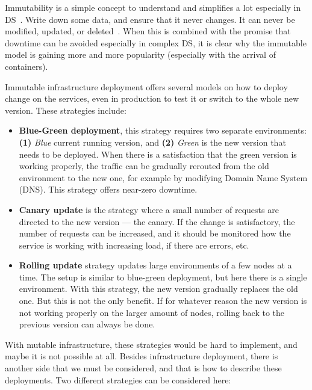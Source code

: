 Immutability is a simple concept to understand and simplifies a lot especially in DS~\cite{Helland16}. Write down some data, and ensure that it never changes. It can never be modified, updated, or deleted~\cite{perry2020art}. When this is combined with the promise that downtime can be avoided especially in complex DS, it is clear why the immutable model is gaining more and more popularity (especially with the arrival of containers). 

Immutable infrastructure deployment offers several models on how to deploy change on the services, even in production to test it or switch to the whole new version. These strategies include:

\begin{itemize}
	\item \textbf{Blue-Green deployment}, this strategy requires two separate environments: \textbf{(1)} \textit{Blue} current running version, and \textbf{(2)} \textit{Green} is the new version that needs to be deployed. When there is a satisfaction that the green version is working properly, the traffic can be gradually rerouted from the old environment to the new one,  for example by modifying Domain Name System (DNS). This strategy offers near-zero downtime.
	\item \textbf{Canary update} is the strategy where a small number of requests are directed to the new version --- the canary. If the change is satisfactory, the number of requests can be increased, and it should be monitored how the service is working with increasing load, if there are errors, etc.
	\item \textbf{Rolling update} strategy updates large environments of a few nodes at a time. The setup is similar to blue-green deployment, but here there is a single environment. With this strategy, the new version gradually replaces the old one. But this is not the only benefit. If for whatever reason the new version is not working properly on the larger amount of nodes, rolling back to the previous version can always be done.
\end{itemize}

\noindent
With mutable infrastructure, these strategies would be hard to implement, and maybe it is not possible at all. Besides infrastructure deployment, there is another side that we must be considered, and that is how to describe these deployments. Two different strategies can be considered here:

